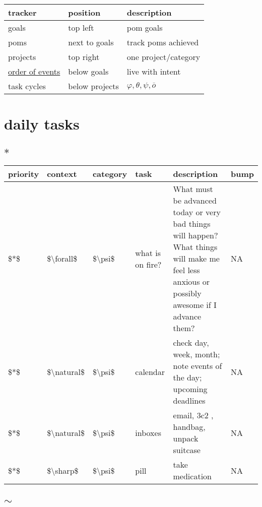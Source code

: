 \documentclass[]{book}
\begin{document}
\begin{longtable}[]{@{}lll@{}}
\toprule
tracker & position & description\tabularnewline
\midrule
\endhead
goals & top left & pom goals\tabularnewline
poms & next to goals & track poms achieved\tabularnewline
projects & top right & one project/category\tabularnewline
\protect\hyperlink{order-of-events}{order of events} & below goals & live with intent\tabularnewline
task cycles & below projects & \(\varphi, \theta, \psi, \overline o\)\tabularnewline
\bottomrule
\end{longtable}

\hypertarget{daily-tasks}{%
\section{daily tasks}\label{daily-tasks}}

\hypertarget{section}{%
\subsection{\texorpdfstring{\(*\)}{*}}\label{section}}

\begin{tabular}{l|l|l|l|l|l}
\hline
priority & context & category & task & description & bump\\
\hline
\$*\$ & \$\textbackslash{}forall\$ & \$\textbackslash{}psi\$ & what is on fire? & What must be advanced today or very bad things will happen? What things will make me feel less anxious or possibly awesome if I advance them? & NA\\
\hline
\$*\$ & \$\textbackslash{}natural\$ & \$\textbackslash{}psi\$ & calendar & check day, week, month; note events of the day; upcoming deadlines & NA\\
\hline
\$*\$ & \$\textbackslash{}natural\$ & \$\textbackslash{}psi\$ & inboxes & email, 3c2 , handbag, unpack suitcase & NA\\
\hline
\$*\$ & \$\textbackslash{}sharp\$ & \$\textbackslash{}psi\$ & pill & take medication & NA\\
\hline
\end{tabular}

\hypertarget{sim}{%
\subsection{\texorpdfstring{\(\sim\)}{\textbackslash{}sim}}\label{sim}}
\end{document}
